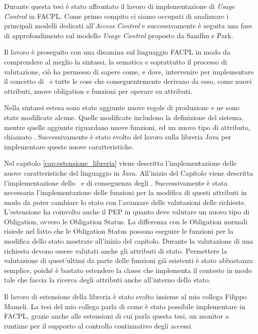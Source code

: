 \label{cap:conclusioni}
Durante questa tesi è stato affrontato il lavoro di implementazione di \textit{Usage Control} in \ac{FACPL}.
Come primo compito ci siamo occupati di analizzare i principali modelli dedicati all'\textit{Access Control} e successivamente è seguita una fase di approfondimento sul modello \textit{Usage Control} proposto da Sandhu e Park.  \par
Il lavoro è proseguito con una disamina sul linguaggio \ac{FACPL} in modo da comprendere al meglio la sintassi, la sematica e soprattutto il processo di valutazione, ciò ha permesso di sapere come, e dove, intervenire per implementare il concetto di \status \ e tutte le cose che conseguentemente  derivano da esso, come nuovi attributi, nuove obligation e funzioni per operare su attributi. \par
Nella sintassi estesa sono state aggiunte nuove regole di produzione e ne sono state modificate alcune. Quelle modificate includono la definizione del sistema, mentre quelle aggiunte riguardano nuove funzioni, ed un nuovo tipo di attributo, chiamato \statusattribute.
Successivamente è stato svolto del lavoro sulla libreria Java per implementare queste nuove caratteristiche. \par
Nel capitolo \ref{cap:estensione_libreria} viene descritta l'implementazione delle nuove caratteristiche del linguaggio in Java. All'inizio del Capitolo viene descritta l'implementazione dello \status \ e di conseguenza degli \statusattribute. Successivamente è stata necessaria  l'implementazione  delle funzioni per la modifica di questi attributi in modo da poter cambiare lo stato con l'avanzare delle valutazioni delle richieste. L'estensione ha coinvolto anche il \ac{PEP} in quanto deve valutare un nuovo tipo di Obligation, ovvero le Obligation Status.
La differenza con le Obligation normali risiede nel fatto che le Obligation Status possono eseguire le funzioni per la modifica dello stato mostrate all'inizio del capitolo.
Durante la valutazione di una richiesta devono essere valutati anche gli attributi di stato. Permettere la valutazione di quest'ultimi da parte delle funzioni già esistenti è stato abbastanza semplice, poiché è bastato estendere la classe che implementa il contesto in modo tale che faccia la ricerca degli attributi anche all'interno dello stato.\par
Il lavoro di estensione della libreria è stato svolto insieme al mio collega Filippo Mameli. La tesi del mio collega parla di come è stato possibile implementare in \ac{FACPL}, grazie anche alle estensioni di cui parla questa tesi, un monitor a runtime per il supporto al controllo continuativo degli accessi.

